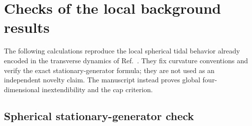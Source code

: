 \section*{Checks of the local background results}

The following calculations reproduce the local spherical tidal behavior
already encoded in the transverse dynamics of
Ref.~\cite[Secs.~3.1--3.3]{BarceloEtAl2022}.  They fix curvature conventions
and verify the exact stationary-generator formula; they are not used as
an independent novelty claim.  The manuscript instead proves global
four-dimensional inextendibility and the cap criterion.

\subsection*{Spherical stationary-generator check}
\label{background:sec:obstruction}

